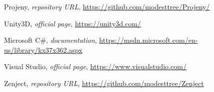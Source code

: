 \begin{thebibliography}{99999}
\singlespace\normalsize

 Projeny, \textit{repository URL}, \url{https://github.com/modesttree/Projeny/}

 Unity3D, \textit{official page}, \url{https://unity3d.com/}

 Microsoft C\#, \textit{documentation}, \url{https://msdn.microsoft.com/en-us/library/kx37x362.aspx}

 Visual Studio, \textit{official page}, \url{https://www.visualstudio.com/}

 Zenject, \textit{repository URL}, \url{https://github.com/modesttree/Zenject}

\end{thebibliography}
